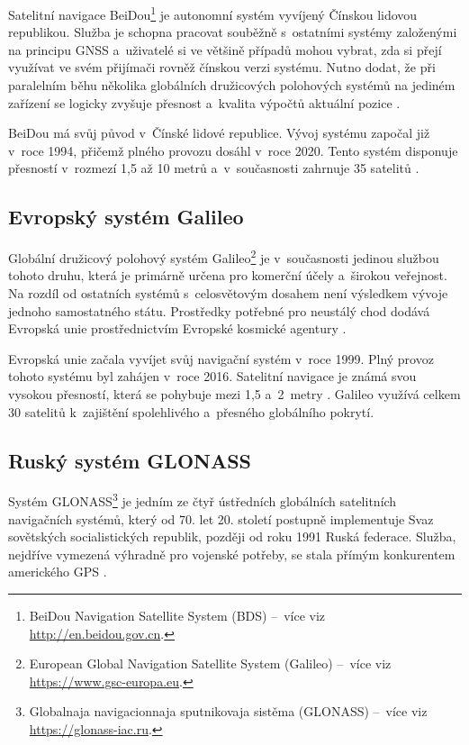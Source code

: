 Satelitní navigace BeiDou\footnote{BeiDou Navigation Satellite System (BDS) --~více viz \url{http://en.beidou.gov.cn}.} je autonomní systém vyvíjený Čínskou lidovou republikou.
Služba je schopna pracovat souběžně s~ostatními systémy založenými na principu GNSS a~uživatelé si ve většině případů mohou vybrat, zda si přejí využívat ve svém přijímači rovněž čínskou verzi systému.
Nutno dodat, že při paralelním běhu několika globálních družicových polohových systémů na jediném zařízení se logicky zvyšuje přesnost a~kvalita výpočtů aktuální pozice \cite{KaplanElliottD2017}.

BeiDou má svůj původ v~Čínské lidové republice.
Vývoj systému započal již v~roce 1994, přičemž plného provozu dosáhl v~roce 2020.
Tento systém disponuje přesností v~rozmezí 1,5 až 10 metrů \cite{SpaceFinland2023} a~v~současnosti zahrnuje 35 satelitů \cite{CDDIS2024}.

\subsection{Evropský systém Galileo}
\label{european-galileo-system}

Globální družicový polohový systém Galileo\footnote{European Global Navigation Satellite System (Galileo) --~více viz \url{https://www.gsc-europa.eu}.} je v~současnosti jedinou službou tohoto druhu, která je primárně určena pro komerční účely a~širokou veřejnost.
Na rozdíl od ostatních systémů s~celosvětovým dosahem není výsledkem vývoje jednoho samostatného státu.
Prostředky potřebné pro neustálý chod dodává Evropská unie prostřednictvím Evropské kosmické agentury \cite{KaplanElliottD2017, NurmiJari2014}.

Evropská unie začala vyvíjet svůj navigační systém v~roce 1999.
Plný provoz tohoto systému byl zahájen v~roce 2016.
Satelitní navigace je známá svou vysokou přesností, která se pohybuje mezi 1,5 a~2~metry \cite{SpaceFinland2023}.
Galileo využívá celkem 30 satelitů \cite{CDDIS2024} k~zajištění spolehlivého a~přesného globálního pokrytí.

\subsection{Ruský systém GLONASS}
\label{russian-glonass-system}

Systém GLONASS\footnote{Globalnaja navigacionnaja sputnikovaja sistěma (GLONASS) --~více viz \url{https://glonass-iac.ru}.} je jedním ze čtyř ústředních globálních satelitních navigačních systémů, který od 70. let 20. století postupně implementuje Svaz sovětských socialistických republik, později od roku 1991 Ruská federace.
Služba, nejdříve vymezená výhradně pro vojenské potřeby, se stala přímým konkurentem amerického GPS \cite{KaplanElliottD2017}.

